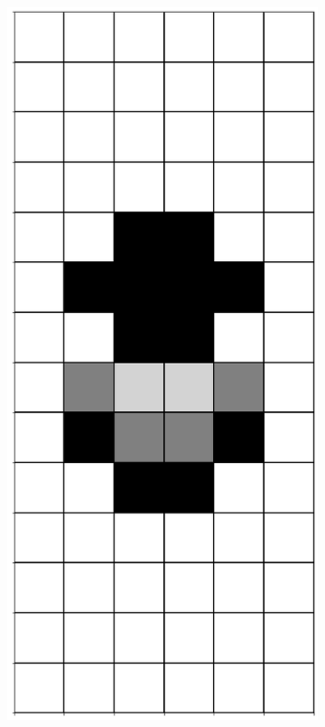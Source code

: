 \documentclass[12pt]{article}
\numberwithin{figure}{section} %
\begin{document}
\begin{figure}[H]
\begin{subfigure}{0.18\textwidth}
     		\subcaption{}
   	\end{subfigure}
    	\begin{subfigure}{0.18\textwidth}
     		\centering
     		\includegraphics[width=\linewidth]{Section4/34.1}

\end{subfigure}
\end{figure}
\end{document}
